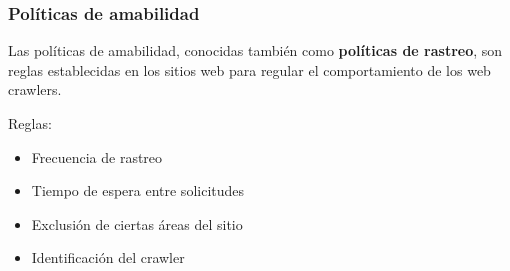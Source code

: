 \documentclass[
10pt, %
aspectratio=169, %
]{beamer}
\begin{document}
	\begin{frame}
		
		\frametitle{Políticas de amabilidad}
		
		Las políticas de amabilidad, conocidas también como \textbf{políticas de rastreo}, son reglas establecidas en los sitios web para regular el comportamiento de los web crawlers.
		
		\vspace{2\baselineskip}
		
		Reglas:
		\begin{itemize}
			\item Frecuencia de rastreo 
			
			\item Tiempo de espera entre solicitudes
			
			\item Exclusión de ciertas áreas del sitio
			
			\item Identificación del crawler
			
		\end{itemize}		
		
	\end{frame}
	
\end{document}
